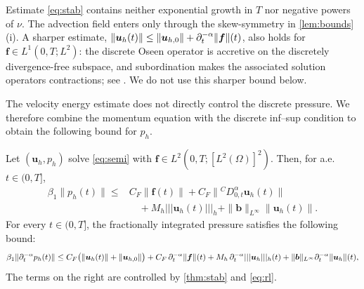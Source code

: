 \begin{remark}
Estimate \eqref{eq:stab} contains neither exponential growth in $T$ nor negative powers of $\nu$. The advection field enters only through the skew-symmetry in \cref{lem:bounds}(i). A sharper estimate, $\|\bm u_h(t)\|\le\|\bm u_{h,0}\|+\partial_t^{-\alpha}\|\bm f\|(t)$, also holds for $\bm f\in L^1(0,T;L^2)$: the discrete Oseen operator is accretive on the discretely divergence-free subspace, and subordination makes the associated solution operators contractions; see \cite{Baz01}. We do not use this sharper bound below.
\end{remark}


The velocity energy estimate does not directly control the discrete pressure. We therefore combine the momentum equation with the discrete inf--sup condition to obtain the following bound for $p_h$.
%
\begin{theorem}
\label{thm:semidiscrete_pressure_stability}
Let $(\bm u_h,p_h)$ solve \eqref{eq:semi} with 
$\bm f \in L^2(0,T;[L^2(\Omega)]^2).$
Then, for a.e.\ $t\in(0,T]$,
\[
\begin{aligned}
\beta_1\|p_h(t)\|
\le {}&
C_F\|\bm f(t)\|
+C_F\|{}^{C}D_{0,t}^{\alpha}\bm u_h(t)\|
\\
&\quad
+M_h|||\bm u_h(t)|||_h
+\|\boldsymbol b\|_{L^\infty}\|\bm u_h(t)\|.
\end{aligned}
\]
For every $t\in(0,T]$, the fractionally integrated pressure satisfies the following bound:
\begin{equation}\label{eq:pstab-int}
\beta_1\|\partial_t^{-\alpha} p_h(t)\|\le C_F\bigl(\|\bm u_h(t)\|+\|\bm u_{h,0}\|\bigr)+C_F\,\partial_t^{-\alpha}\|\bm f\|(t)+M_h\,\partial_t^{-\alpha}|||\bm u_h|||_h(t)+\|\boldsymbol b\|_{L^\infty}\partial_t^{-\alpha}\|\bm u_h\|(t),
\end{equation}
The terms on the right are controlled by \cref{thm:stab} and \eqref{eq:rl}.
\end{theorem}
%
